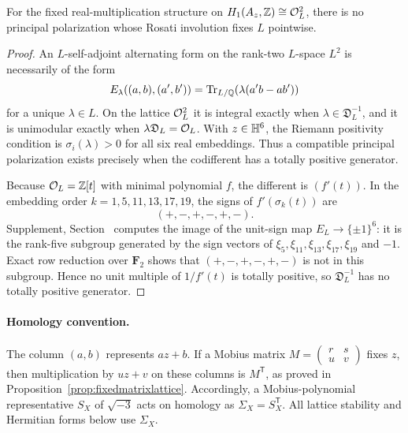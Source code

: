\begin{proposition}\label{prop:noprincipal}
For the fixed real-multiplication structure on $H_1(A_z,\mathbb Z)\cong\mathcal O_L^2$, there is no principal polarization whose Rosati involution fixes $L$ pointwise.
\end{proposition}
\begin{proof}
An $L$-self-adjoint alternating form on the rank-two $L$-space $L^2$ is necessarily of the form
\[
 E_\lambda((a,b),(a',b'))=\operatorname{Tr}_{L/\mathbb Q}\!\left(\lambda(a'b-ab')\right)
\]
for a unique $\lambda\in L$.  On the lattice $\mathcal O_L^2$ it is integral exactly when $\lambda\in\mathfrak D_L^{-1}$, and it is unimodular exactly when $\lambda\mathfrak D_L=\mathcal O_L$.  With $z\in\mathbb H^6$, the Riemann positivity condition is $\sigma_i(\lambda)>0$ for all six real embeddings.  Thus a compatible principal polarization exists precisely when the codifferent has a totally positive generator.

Because $\mathcal O_L=\mathbb Z[t]$ with minimal polynomial $f$, the different is $(f'(t))$.  In the embedding order $k=1,5,11,13,17,19$, the signs of $f'(\sigma_k(t))$ are
\[
 (+,-,+,-,+,-).
\]
Supplement, Section~ computes the image of the unit-sign map $E_L\to\{\pm1\}^6$: it is the rank-five subgroup generated by the sign vectors of $\xi_5,\xi_{11},\xi_{13},\xi_{17},\xi_{19}$ and $-1$.  Exact row reduction over $\mathbf F_2$ shows that $(+,-,+,-,+,-)$ is not in this subgroup.  Hence no unit multiple of $1/f'(t)$ is totally positive, so $\mathfrak D_L^{-1}$ has no totally positive generator.
\end{proof}

\paragraph{Homology convention.}
The column $(a,b)$ represents $az+b$.  If a Mobius matrix
$M=\left(\begin{smallmatrix}r&s\\u&v\end{smallmatrix}\right)$ fixes $z$,
then multiplication by $uz+v$ on these columns is $M^{\mathsf T}$, as
proved in Proposition~\ref{prop:fixedmatrixlattice}.  Accordingly, a
Mobius-polynomial representative $S_X$ of $\sqrt{-3}$ acts on homology as
$\Sigma_X=S_X^{\mathsf T}$.  All lattice stability and Hermitian forms
below use $\Sigma_X$.


